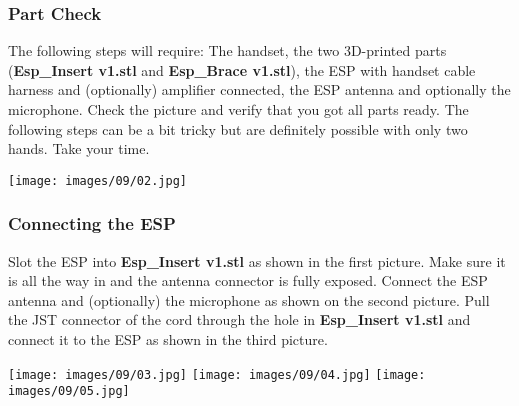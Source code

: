 \documentclass[]{article}
\begin{document}
\subsubsection{Part Check}
\begin{minipage}[t]{0.4\linewidth}
	\vspace{0pt}
	The following steps will require: The handset, the two 3D-printed parts (\textbf{Esp\_Insert v1.stl} and \textbf{Esp\_Brace v1.stl}), the ESP with handset cable harness and (optionally) amplifier connected, the ESP antenna and optionally the microphone. Check the picture and verify that you got all parts ready.
	\newline
	\newline
	The following steps can be a bit tricky but are definitely possible with only two hands. Take your time.
\end{minipage}
\hfill
\begin{minipage}[t]{0.5\linewidth}
	\vspace{0pt}
	\texttt{[image: images/09/02.jpg]}
\end{minipage}
\subsubsection{Connecting the ESP}
\begin{minipage}[t]{0.4\linewidth}
	\vspace{0pt}
	Slot the ESP into \textbf{Esp\_Insert v1.stl} as shown in the first picture. Make sure it is all the way in and the antenna connector is fully exposed.
	\newline
	\newline
	Connect the ESP antenna and (optionally) the microphone as shown on the second picture.
	\newline
	\newline
	Pull the JST connector of the cord through the hole in \textbf{Esp\_Insert v1.stl} and connect it to the ESP as shown in the third picture.
\end{minipage}
\hfill
\begin{minipage}[t]{0.45\linewidth}
	\vspace{0pt}
	\texttt{[image: images/09/03.jpg]}
	\texttt{[image: images/09/04.jpg]}
	\texttt{[image: images/09/05.jpg]}
\end{minipage}
\end{document}
